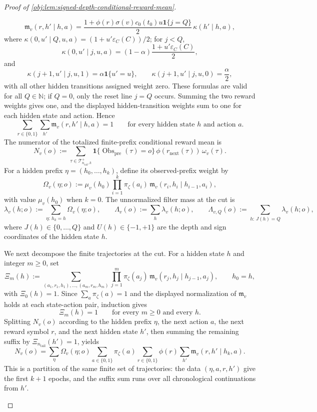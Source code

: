 \documentclass[11pt]{article}
\begin{document}
\begin{proof}[Proof of \cref{obj:lem:signed-depth-conditional-reward-mean}]
\begin{enumerate}
\[
\mathfrak m_v(r,h'\mid h,a)
=
\frac{1+\phi(r)\sigma(v)c_0(t_0)u\mathbf 1\{j=Q\}}{2}
\,\kappa(h'\mid h,a),
\]
where \(\kappa(0,u'\mid Q,u,a)=(1+u'\varepsilon_C(C))/2\); for \(j<Q\),
\[
\kappa(0,u'\mid j,u,a)=(1-\alpha)\frac{1+u'\varepsilon_C(C)}{2},
\]
and
\[
\kappa(j+1,u'\mid j,u,1)=\alpha\mathbf 1\{u'=u\},
\qquad
\kappa(j+1,u'\mid j,u,0)=\frac{\alpha}{2},
\]
with all other hidden transitions assigned weight zero. These formulas are valid for all \(Q\in\mathbb N\); if \(Q=0\), only the reset line \(j=Q\) occurs. Summing the two reward weights gives one, and the displayed hidden-transition weights sum to one for each hidden state and action. Hence
\[
\sum_{r\in\{0,1\}}\sum_{h'}
\mathfrak m_v(r,h'\mid h,a)=1
\qquad
\text{for every hidden state }h\text{ and action }a.
\]
The numerator of the totalized finite-prefix conditional reward mean is
\[
N_v(o):=
\sum_{\tau\in\mathcal T^+_{n_{\mathrm{tail}},k}}
\mathbf 1\{\operatorname{Obs}_{\mathrm{pre}}(\tau)=o\}\,
\phi(r_{\mathrm{next}}(\tau))\,\omega_v(\tau).
\]
For a hidden prefix \(\eta=(h_0,\ldots,h_k)\), define its observed-prefix weight by
\[
\Omega_v(\eta;o)
:=
\mu_v(h_0)
\prod_{i=1}^{k}
\pi_\zeta(a_i)\,
\mathfrak m_v(r_i,h_i\mid h_{i-1},a_i),
\]
with value \(\mu_v(h_0)\) when \(k=0\). The unnormalized filter mass at the cut is
\[
\lambda_v(h;o)
:=
\sum_{\eta:\,h_k=h}\Omega_v(\eta;o),
\qquad
\Lambda_v(o):=\sum_h \lambda_v(h;o),
\qquad
\Lambda_{v,Q}(o):=\sum_{h:\,J(h)=Q}\lambda_v(h;o),
\]
where \(J(h)\in\{0,\ldots,Q\}\) and \(U(h)\in\{-1,+1\}\) are the depth and sign coordinates of the hidden state \(h\).

We next decompose the finite trajectories at the cut. For a hidden state \(h\) and integer \(m\ge0\), set
\[
\Xi_m(h)
:=
\sum_{(a_1,r_1,h_1),\ldots,(a_m,r_m,h_m)}
\prod_{j=1}^{m}
\pi_\zeta(a_j)\,
\mathfrak m_v(r_j,h_j\mid h_{j-1},a_j),
\qquad h_0=h,
\]
with \(\Xi_0(h)=1\). Since \(\sum_a\pi_\zeta(a)=1\) and the displayed normalization of \(\mathfrak m_v\) holds at each state-action pair, induction gives
\[
\Xi_m(h)=1
\qquad
\text{for every }m\ge0\text{ and every }h.
\]
Splitting \(N_v(o)\) according to the hidden prefix \(\eta\), the next action \(a\), the next reward symbol \(r\), and the next hidden state \(h'\), then summing the remaining suffix by \(\Xi_{n_{\mathrm{tail}}}(h')=1\), yields
\[
N_v(o)
=
\sum_{\eta}\Omega_v(\eta;o)
\sum_{a\in\{0,1\}}\pi_\zeta(a)
\sum_{r\in\{0,1\}}\phi(r)
\sum_{h'}\mathfrak m_v(r,h'\mid h_k,a).
\]
This is a partition of the same finite set of trajectories: the data \((\eta,a,r,h')\) give the first \(k+1\) epochs, and the suffix sum runs over all chronological continuations from \(h'\).


\end{enumerate}
\end{proof}
\end{document}
